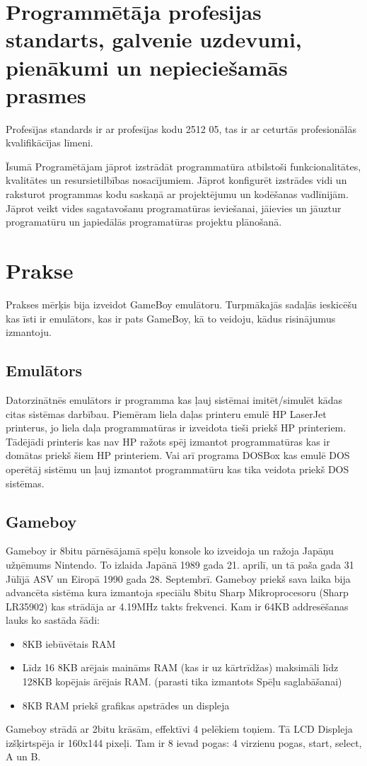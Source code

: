 \documentclass[12pt]{article}
\begin{document}
	\section{Programmētāja profesijas standarts, galvenie uzdevumi, pienākumi un nepieciešamās prasmes}
	
	Profesījas standards ir ar profesījas kodu 2512 05, tas ir ar ceturtās profesionālās kvalifikācījas līmeni.
	
	Īsumā Programētājam jāprot izstrādāt programmatūra atbilstoši funkcionalitātes, kvalitātes un resursietilbības nosacījumiem. Jāprot konfigurēt izstrādes vidi un raksturot programmas kodu saskaņā ar projektējumu un kodēšanas vadlīnijām. Jāprot veikt vides sagatavošanu programatūras ieviešanai, jāievies un jāuztur programatūru un japiedālās programatūras projektu plānošanā.
	
	\section{Prakse}
	Prakses mērķis bija izveidot GameBoy emulātoru. Turpmākajās sadaļās ieskicēšu kas īsti ir emulātors, kas ir pats GameBoy, kā to veidoju, kādus risinājumus izmantoju.
	\subsection{Emulātors}
	Datorzinātnēs emulātors ir programma kas ļauj sistēmai imitēt/simulēt kādas citas  sistēmas darbībau. Piemēram liela daļas printeru emulē HP LaserJet printerus, jo liela daļa programmatūras ir izveidota tieši priekš HP printeriem. Tādējādi printeris kas nav HP ražots spēj izmantot programmatūras kas ir domātas priekš šiem HP printeriem. Vai arī programa DOSBox kas emulē DOS operētāj sistēmu un ļauj izmantot programmatūru kas tika veidota priekš DOS sistēmas.
	
	\subsection{Gameboy}
	Gameboy ir 8bitu pārnēsājamā spēļu konsole ko izveidoja un ražoja Japāņu užņēmums Nintendo. To izlaida Japānā 1989 gada 21. aprilī, un tā paša gada 31 Jūlījā ASV un Eiropā 1990 gada 28. Septembrī. Gameboy priekš sava laika bija advancēta sistēma kura izmantoja speciālu 8bitu Sharp Mikroprocesoru (Sharp LR35902) kas strādāja ar 4.19MHz takts frekvenci. Kam ir 64KB addresēšanas lauks ko sastāda šādi:
	\begin{itemize}
		\item 8KB iebūvētais RAM
		\item Līdz 16 8KB arējais maināms RAM (kas ir uz kārtrīdžas) maksimāli līdz 128KB kopējais ārējais RAM. (parasti tika izmantots Spēļu saglabāšanai)
		\item 8KB RAM priekš grafikas apstrādes un displeja
	\end{itemize}
	Gameboy strādā ar 2bitu krāsām, effektīvi 4 pelēkiem toņiem. Tā LCD Displeja izšķirtspēja ir 160x144 pixeļi.
	Tam ir 8 ievad pogas: 4 virzienu pogas, start, select, A un B.
	
\end{document}
